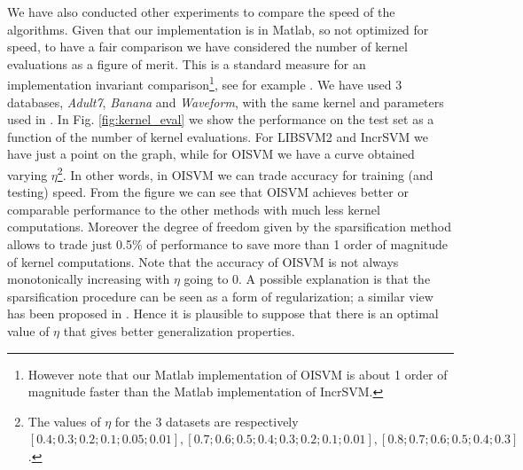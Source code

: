 We have also conducted other experiments to compare the speed of the
algorithms. Given that our implementation is in Matlab, so not optimized for
speed, to have a fair comparison we have considered the number of kernel
evaluations as a figure of merit. This is a standard measure
for an implementation invariant comparison\footnote{However note that our Matlab implementation
of OISVM is about 1 order of magnitude faster than the Matlab implementation of IncrSVM.},
see for example \cite{BordesEWB05,DiehlC03}.
We have used 3 databases, \emph{Adult7}, \emph{Banana} and \emph{Waveform}, with
the same kernel and parameters used in \cite{BordesEWB05}. 
In Fig. \ref{fig:kernel_eval} we show the performance on the test set
as a function of the number of kernel evaluations. For LIBSVM2 and IncrSVM we have just
a point on the graph, while for OISVM we have a curve obtained varying $\eta$\footnote{
The values of $\eta$ for the 3 datasets are respectively $[0.4;0.3;0.2;0.1;0.05;0.01],
[0.7;0.6;0.5;0.4;0.3;0.2;0.1;0.01],[0.8;0.7;0.6;0.5;0.4;0.3]$.}.
In other words, in OISVM we can trade accuracy for training (and testing) speed.
From the figure we can see that OISVM achieves better or comparable performance
to the other methods with much less kernel computations. Moreover the degree of freedom
given by the sparsification method allows to trade just 0.5\% of performance to
save more than 1 order of magnitude of kernel computations.
Note that the accuracy of OISVM is not always monotonically increasing with
$\eta$ going to 0. A possible explanation is that the sparsification procedure
can be seen as a form of regularization; a similar view has been proposed in 
\cite{BlanchardMVZ05}. Hence it is plausible to suppose that there is an optimal
value of $\eta$ that gives better generalization properties.


